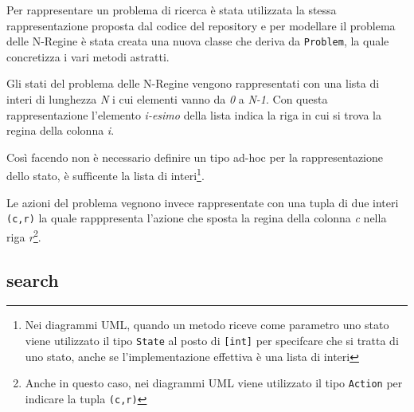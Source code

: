Per rappresentare un problema di ricerca è stata utilizzata la stessa rappresentazione proposta dal codice del repository e per modellare il problema delle N-Regine è stata creata una nuova classe che deriva da \texttt{Problem}, la quale concretizza i vari metodi astratti.

Gli stati del problema delle N-Regine vengono rappresentati con una lista di interi di lunghezza \textit{N} i cui elementi vanno da \textit{0} a \textit{N-1}. Con questa rappresentazione l'elemento \textit{i-esimo} della lista indica la riga in cui si trova la regina della colonna \textit{i}.

Così facendo non è necessario definire un tipo ad-hoc per la rappresentazione dello stato, è sufficente la lista di interi\footnote{Nei diagrammi UML, quando un metodo riceve come parametro uno stato viene utilizzato il tipo \texttt{State} al posto di \texttt{[int]} per specifcare che si tratta di uno stato, anche se l'implementazione effettiva è una lista di interi}. 

Le azioni del problema vegnono invece rappresentate con una tupla di due interi \texttt{(c,r)} la quale rapppresenta l'azione che sposta la regina della colonna \textit{c} nella riga \textit{r}\footnote{Anche in questo caso, nei diagrammi UML viene utilizzato il tipo \texttt{Action} per indicare la tupla \texttt{(c,r)}}.

\subsection{search}

